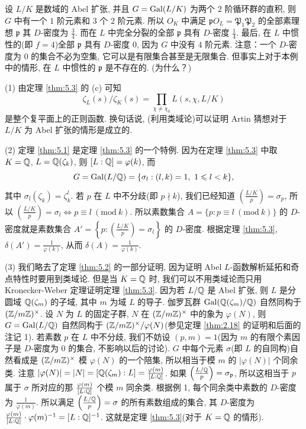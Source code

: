\begin{example}
设 $L/K$ 是数域的 Abel 扩张, 并且 $G=\operatorname{Gal}(L/K)$ 为两个 $2$ 阶循环群的直积, 则 $G$ 中有一个 $1$ 阶元素和 $3$ 个 $2$ 阶元素. 所以 $O_K$ 中满足 $\mathfrak{p}O_L=\mathfrak{P}_1\mathfrak{P}_2$ 的全部素理想 $\mathfrak{p}$ 其 $D$-密度为 $\frac{3}{4}$. 而在 $L$ 中完全分裂的全部 $\mathfrak{p}$ 具有 $D$-密度 $\frac{1}{4}$. 最后, 在 $L$ 中惯性的(即 $f=4$)全部 $\mathfrak{p}$ 具有 $D$-密度 $0$, 因为 $G$ 中没有 $4$ 阶元素. 注意：一个 $D$-密度为 $0$ 的集合不必为空集, 它可以是有限集合甚至是无限集合. 但事实上对于本例中的情形, 在 $L$ 中惯性的 $\mathfrak{p}$ 是不存在的. (为什么？)
\end{example}

\begin{remark}
(1) 由定理 \ref{thm:5.3} 的 (c) 可知
\[
  \zeta_L(s)/\zeta_K(s)=\prod_{\chi\neq\chi_0}L(s,\chi,L/K)
\]
是整个复平面上的正则函数. 换句话说, (利用类域论)可以证明 Artin 猜想对于 $L/K$ 为 Abel 扩张的情形是成立的. 

(2) 定理 \ref{thm:5.1} 是定理 \ref{thm:5.3} 的一个特例. 因为在定理 \ref{thm:5.3} 中取 $K=\mathbb{Q}$, $L=\mathbb{Q}(\zeta_k)$, 则 $[L:\mathbb{Q}]=\varphi(k)$, 而
\[
  G=\operatorname{Gal}(L/\mathbb{Q})=\{\sigma_l:(l,k)=1,\ 1\leqslant l<k\},
\]
其中 $\sigma_l(\zeta_k)=\zeta_k^l$. 若 $p$ 在 $L$ 中不分歧(即 $p\nmid k$), 我们已经知道 $\left(\frac{L/K}{p}\right)=\sigma_p$, 所以 $\left(\frac{L/K}{p}\right)=\sigma_l\Leftrightarrow p\equiv l\ (\mathrm{mod}\ k)$. 所以素数集合 $A=\{p:p\equiv l\ (\mathrm{mod}\ k)\}$ 的 $D$-密度就是素数集合 $A'=\left\{p:\left(\frac{L/K}{p}\right)=\sigma_l\right\}$ 的 $D$-密度. 根据定理 \ref{thm:5.3}, $\delta(A')=\frac{1}{\varphi(k)}$, 从而 $\delta(A)=\frac{1}{\varphi(k)}$. 

(3) 我们略去了定理 \ref{thm:5.2} 的一部分证明, 因为证明 Abel $L$-函数解析延拓和奇点特性时要用到类域论. 但是当 $K=\mathbb{Q}$ 时, 我们可以不用类域论而只用 Kronecker-Weber 定理证明定理 \ref{thm:5.3}. 因为若 $L/\mathbb{Q}$ 是 Abel 扩张, 则 $L$ 是分圆域 $\mathbb{Q}(\zeta_m)$ 的子域, 其中 $m$ 为域 $L$ 的导子. 伽罗瓦群 $\operatorname{Gal}(\mathbb{Q}(\zeta_m)/\mathbb{Q})$ 自然同构于 $(\mathbb{Z}/m\mathbb{Z})^{\times}$. 设 $N$ 为 $L$ 的固定子群, $N$ 在 $(\mathbb{Z}/m\mathbb{Z})^{\times}$ 中的象为 $\varphi(N)$, 则 $G=\operatorname{Gal}(L/\mathbb{Q})$ 自然同构于 $(\mathbb{Z}/m\mathbb{Z})^{\times}/\varphi(N)$(参见定理 \ref{thm:2.18} 的证明和后面的注记 1). 若素数 $p$ 在 $L$ 中不分歧, 我们不妨设 $(p,m)=1$(因为 $m$ 的有限个素因子是 $D$-密度为 $0$ 的集合, 不影响以后的讨论). $G$ 中每个元素 $\sigma$(即 $L$ 的自同构)自然看成是 $(\mathbb{Z}/m\mathbb{Z})^{\times}$ 模 $\varphi(N)$ 的一个陪集, 所以相当于模 $m$ 的 $|\varphi(N)|$ 个同余类. 注意 $|\varphi(N)|=|N|=[\mathbb{Q}(\zeta_m):L]=\frac{\varphi(m)}{[L:\mathbb{Q}]}$. 如果 $\left(\frac{L/\mathbb{Q}}{p}\right)=\sigma_{\mathfrak{p}}$, 所以这相当于 $p$ 属于 $\sigma$ 所对应的那 $\frac{\varphi(m)}{[L:\mathbb{Q}]}$ 个模 $m$ 同余类. 根据例 1, 每个同余类中素数的 $D$-密度为 $\frac{1}{\varphi(m)}$. 所以满足 $\left(\frac{L/\mathbb{Q}}{p}\right)=\sigma$ 的所有素数组成的集合, 其 $D$-密度为 $\frac{\varphi(m)}{[L:\mathbb{Q}]}\cdot\varphi(m)^{-1}=[L:\mathbb{Q}]^{-1}$. 这就是定理 \ref{thm:5.3}(对于 $K=\mathbb{Q}$ 的情形). 
\end{remark}

